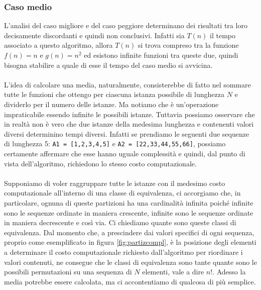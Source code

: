 \documentclass[11pt,a4paper,oneside]{article}
\begin{document}
\subsubsection{Caso medio} L'analisi del caso migliore e del caso peggiore determinano dei risultati tra loro decisamente discordanti e quindi non conclusivi. Infatti sia $T(n)$ il tempo associato a questo algoritmo, allora $T(n)$ si trova compreso tra la funzione $f(n) = n$ e $g(n) = n^2$ ed esistono infinite funzioni tra queste due, quindi bisogna stabilire a quale di esse il tempo del caso medio si avvicina.\\\\L'idea di calcolare una media, naturalmente, consisterebbe di fatto nel sommare tutte le funzioni che ottengo per ciascuna istanza possibile di lunghezza $N$ e dividerlo per il numero delle istanze. Ma notiamo che è un'operazione impraticabile essendo infinite le possibili istanze. Tuttavia possiamo osservare che in realtà non è vero che due istanze della medesima lunghezza e contenenti valori diversi determinino tempi diversi. Infatti se prendiamo le seguenti due sequenze di lunghezza 5: \texttt{A1 = [1,2,3,4,5]} e \texttt{A2 = [22,33,44,55,66]}, possiamo certamente affermare che esse hanno uguale complessità e quindi, dal punto di vista dell'algoritmo, richiedono lo stesso costo computazionale.\\\\Supponiamo di voler raggruppare tutte le istanze con il medesimo costo computazionale all'interno di una classe di equivalenza, ci accorgiamo che, in particolare, ognuna di queste partizioni ha una cardinalità infinita poiché infinite sono le sequenze ordinate in maniera crescente, infinite sono le sequenze ordinate in maniera decrescente e così via. Ci chiediamo quante sono queste classi di equivalenza. Dal momento che, a prescindere dai valori specifici di ogni sequenza, proprio come esemplificato in figura \ref{fig:partizcompl}, è la posizione degli elementi a determinare il costo computazionale richiesto dall'algoritmo per riordinare i valori contenuti, ne consegue che le classi di equivalenza sono tante quante sono le possibili permutazioni su una sequenza di $N$ elementi, vale a dire $n!$. Adesso la media potrebbe essere calcolata, ma ci accontentiamo di qualcosa di più semplice.
\end{document}
